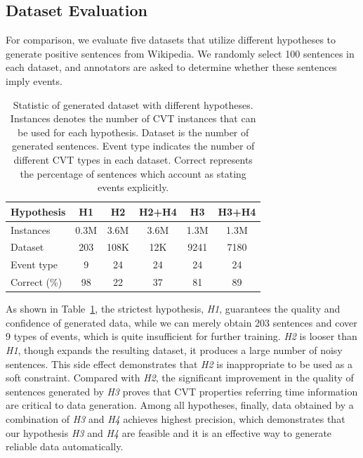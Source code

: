 \documentclass{article}
\begin{document}
\subsection{Dataset Evaluation}\label{sec:evalhypo}
For comparison, we evaluate five datasets that utilize different hypotheses to generate positive sentences from Wikipedia. We randomly select 100 sentences in each dataset, and annotators are asked to determine whether these sentences imply events.

\begin{table}[h]
\small
\centering
\begin{tabular}{|l|c|c|c|c|c|} \hline
	Hypothesis & H1 & H2 & H2+H4 & H3 & H3+H4 \\ \hline
	Instances & 0.3M & 3.6M & 3.6M & 1.3M & 1.3M \\ \hline
	Dataset & 203 & 108K & 12K & 9241 & 7180 \\ \hline
	Event type & 9 & 24 & 24 & 24 & 24 \\ \hline
	Correct (\%) & 98 & 22 & 37 & 81 & 89 \\ \hline
\end{tabular}
\caption{Statistic of generated dataset with different hypotheses. Instances denotes the number of CVT instances that can be used for each hypothesis. Dataset is the number of generated sentences. Event type indicates the number of different CVT types in each dataset. Correct represents the percentage of sentences which account as stating events explicitly. \label{tab:3}}
\end{table}

As shown in Table~\ref{tab:3}, the strictest hypothesis, \emph{H1}, guarantees the quality and confidence of generated data, while we can merely obtain 203 sentences and cover 9 types of events,  which is quite insufficient for further training. \emph{H2} is looser than \emph{H1}, though expands the resulting dataset, it produces a large number of noisy sentences. This side effect demonstrates that \emph{H2} is inappropriate to be used as a soft constraint. Compared with \emph{H2}, the significant improvement in the quality of sentences generated by \emph{H3} proves that CVT properties referring time information are critical to data generation. Among all hypotheses, finally, data obtained by a combination of \emph{H3} and \emph{H4} achieves highest precision, which demonstrates that our hypothesis \emph{H3} and \emph{H4} are feasible and it is an effective way to generate reliable data automatically.
\end{document}
